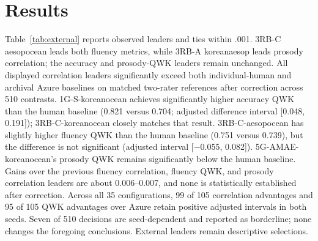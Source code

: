\documentclass[cameraready]{Interspeech}
\begin{document}
\section{Results}
Table~\ref{tab:external} reports observed leaders and ties within .001. 3RB-C aesopocean leads both fluency metrics, while 3RB-A koreanaesop leads prosody correlation; the accuracy and prosody-QWK leaders remain unchanged. All displayed correlation leaders significantly exceed both individual-human and archival Azure baselines on matched two-rater references after correction across 510 contrasts. 1G-S-koreanocean achieves significantly higher accuracy QWK than the human baseline (0.821 versus 0.704; adjusted difference interval [0.048, 0.191]); 3RB-C-koreanocean closely matches that result. 3RB-C-aesopocean has slightly higher fluency QWK than the human baseline (0.751 versus 0.739), but the difference is not significant (adjusted interval [$-$0.055, 0.082]). 5G-AMAE-koreanocean's prosody QWK remains significantly below the human baseline. Gains over the previous fluency correlation, fluency QWK, and prosody correlation leaders are about 0.006--0.007, and none is statistically established after correction. Across all 35 configurations, 99 of 105 correlation advantages and 95 of 105 QWK advantages over Azure retain positive adjusted intervals in both seeds. Seven of 510 decisions are seed-dependent and reported as borderline; none changes the foregoing conclusions. External leaders remain descriptive selections.
\end{document}
